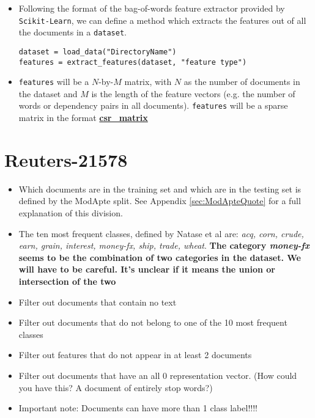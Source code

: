 \documentclass[12pt]{article}
\newcommand{\bt}[1]{\textbf{#1}}
\begin{document}
\begin{itemize}
\item Following the format of the bag-of-words feature extractor provided by {\tt Scikit-Learn}, we can define a method which extracts the features out of all the documents in a {\tt dataset}. 
\begin{lstlisting}
dataset = load_data("DirectoryName")
features = extract_features(dataset, "feature type")
\end{lstlisting}
\item {\tt features} will be a $N$-by-$M$ matrix, with $N$ as the number of documents in the dataset and $M$ is the length of the feature vectors (e.g. the number of words or dependency pairs in all documents). {\tt features} will be a sparse matrix in the format \href{http://docs.scipy.org/doc/scipy/reference/sparse.html}{\bt{csr\_matrix}}
\end{itemize}
  
\section{Reuters-21578}

\begin{itemize}
\item Which documents are in the training set and which are in the testing set is defined by the ModApte split.  See Appendix \hyperref[sec:ModApteQuote]{\ref{sec:ModApteQuote}} for a full explanation of this division.
\item The ten most frequent classes, defined by Natase et al are: \emph{acq, corn, crude, earn, grain, interest, money-fx, ship, trade, wheat}. \bt{The category \emph{money-fx} seems to be the combination of two categories in the dataset. We will have to be careful. It's unclear if it means the union or intersection of the two}
\item Filter out documents that contain no text 
\item Filter out documents that do not belong to one of the 10 most frequent classes
\item Filter out features that do not appear in at least 2 documents
\item Filter out documents that have an all 0 representation vector. (How could you have this? A document of entirely stop words?)
\item Important note: Documents can have more than 1 class label!!!!
\end{itemize}  
\end{document}
